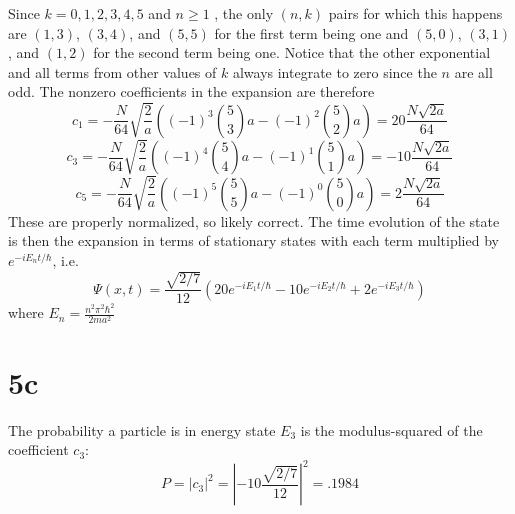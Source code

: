 \documentclass{article}
\begin{document}
Since $k=0,1,2,3,4,5$ and $n\geq 1$ , the only $(n,k)$ pairs for which this happens are $(1,3)$, $(3,4)$, and $(5,5)$ for the first term being one and $(5,0)$, $(3,1)$, and $(1,2)$ for the second term being one. Notice that the other exponential and all terms from other values of $k$ always integrate to zero since the $n$ are all odd.
The nonzero coefficients in the expansion are therefore
\[c_{1}=-\frac{N}{64}\sqrt{\frac{2}{a}}\left( (-1)^{3}\binom{5}{3}a-(-1)^{2}\binom{5}{2}a \right)=20\frac{N\sqrt{2a}}{64}\]
\[c_{3}=-\frac{N}{64}\sqrt{\frac{2}{a}}\left( (-1)^{4}\binom{5}{4}a-(-1)^{1}\binom{5}{1}a \right)=-10\frac{N\sqrt{2a}}{64}\]
\[c_{5}=-\frac{N}{64}\sqrt{\frac{2}{a}}\left( (-1)^{5}\binom{5}{5}a-(-1)^{0}\binom{5}{0}a \right)=2\frac{N\sqrt{2a}}{64}\]
These are properly normalized, so likely correct.
The time evolution of the state is then the expansion in terms of stationary states with each term multiplied by $e^{-iE_{n}t/\hbar}$, i.e.
\[\Psi(x,t)=\frac{\sqrt{2/7}}{12 }\left( 20e^{-iE_{1}t/\hbar}-10e^{-iE_{2}t/\hbar}+2e^{-iE_{3}t/\hbar} \right)\]
where $E_{n}=\frac{n^{2}\pi^{2}\hbar^{2}}{2ma^{2}}$

\section*{5c}
The probability a particle is in energy state $E_{3}$ is the modulus-squared of the coefficient $c_{3}$:
\[P=|c_{3}|^{2}=\left| -10\frac{\sqrt{2/7}}{12} \right|^{2}=.1984\]
\end{document}
